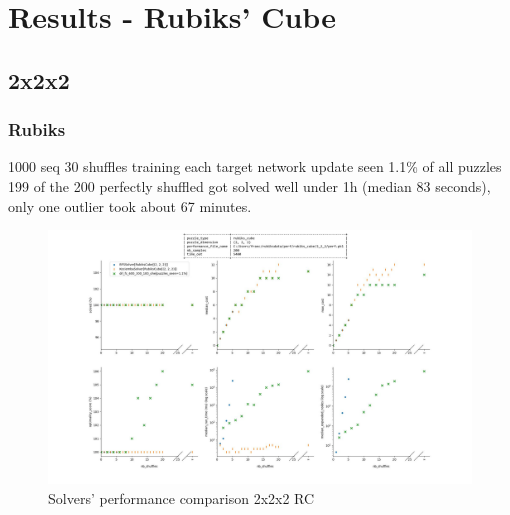 
\chapter{Results - Rubiks' Cube} %

\label{Chapter5} %


\section{2x2x2}

\subsection{Rubiks}

1000 seq 30 shuffles training each target network update seen 1.1\% of all puzzles
199 of the 200 perfectly shuffled got solved well under 1h (median 83 seconds), only one outlier took about 67 minutes.


\begin{landscape}
\centering\vspace*{\fill}
\begin{figure}[H]
\centering
\includegraphics[scale=0.50]{./Figures/222RCPerformance.jpeg}
\caption[222RCPerformance]{Solvers' performance comparison 2x2x2 RC}
\label{fig:222RCPerformance}
\end{figure}
\vfill
\end{landscape}
\restoregeometry


